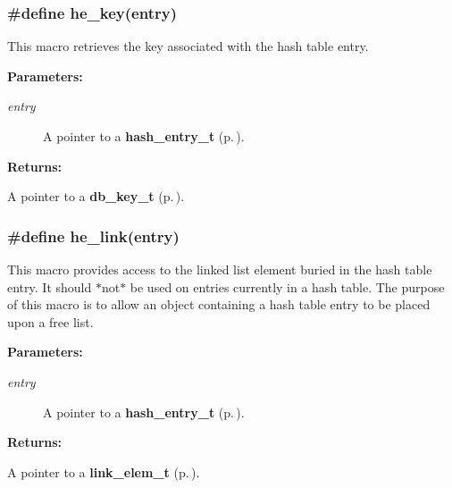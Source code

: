 \subsubsection{\setlength{\rightskip}{0pt plus 5cm}\#define he\_\-key(entry)}\label{group__dbprim__hash_a35}




 This macro retrieves the key associated with the hash table entry.\begin{Desc}
\item[{\bf Parameters: }]\par
\begin{description}
\item[
{\em entry}]A pointer to a {\bf hash\_\-entry\_\-t} {\rm (p.\,\pageref{group__dbprim__hash_a1})}.

\end{description}
\end{Desc}
\begin{Desc}
\item[{\bf Returns: }]\par
A pointer to a {\bf db\_\-key\_\-t} {\rm (p.\,\pageref{group__dbprim__key_a0})}. \end{Desc}
\subsubsection{\setlength{\rightskip}{0pt plus 5cm}\#define he\_\-link(entry)}\label{group__dbprim__hash_a31}




 This macro provides access to the linked list element buried in the hash table entry. It should $\ast$not$\ast$ be used on entries currently in a hash table. The purpose of this macro is to allow an object containing a hash table entry to be placed upon a free list.\begin{Desc}
\item[{\bf Parameters: }]\par
\begin{description}
\item[
{\em entry}]A pointer to a {\bf hash\_\-entry\_\-t} {\rm (p.\,\pageref{group__dbprim__hash_a1})}.

\end{description}
\end{Desc}
\begin{Desc}
\item[{\bf Returns: }]\par
A pointer to a {\bf link\_\-elem\_\-t} {\rm (p.\,\pageref{group__dbprim__link_a1})}. \end{Desc}
